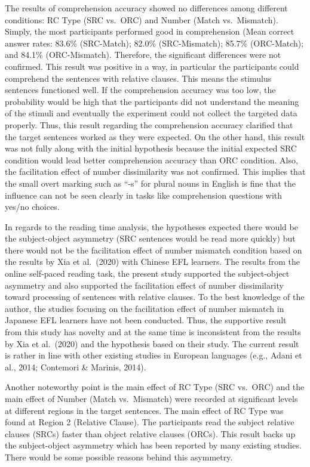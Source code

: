 \documentclass[
]{article}
\begin{document}
The results of comprehension accuracy showed no differences among
different conditions: RC Type (SRC vs.~ORC) and Number (Match
vs.~Mismatch). Simply, the most participants performed good in
comprehension (Mean correct answer rates: 83.6\% (SRC-Match); 82.0\%
(SRC-Mismatch); 85.7\% (ORC-Match); and 84.1\% (ORC-Mismatch).
Therefore, the significant differences were not confirmed. This result
was positive in a way, in particular the participants could comprehend
the sentences with relative clauses. This means the stimulus sentences
functioned well. If the comprehension accuracy was too low, the
probability would be high that the participants did not understand the
meaning of the stimuli and eventually the experiment could not collect
the targeted data properly. Thus, this result regarding the
comprehension accuracy clarified that the target sentences worked as
they were expected. On the other hand, this result was not fully along
with the initial hypothesis because the initial expected SRC condition
would lead better comprehension accuracy than ORC condition. Also, the
facilitation effect of number dissimilarity was not confirmed. This
implies that the small overt marking such as ``-s'' for plural nouns in
English is fine that the influence can not be seen clearly in tasks like
comprehension questions with yes/no choices.

In regards to the reading time analysis, the hypotheses expected there
would be the subject-object asymmetry (SRC sentences would be read more
quickly) but there would not be the facilitation effect of number
mismatch condition based on the results by Xia et al.~(2020) with
Chinese EFL learners. The results from the online self-paced reading
task, the present study supported the subject-object asymmetry and also
supported the facilitation effect of number dissimilarity toward
processing of sentences with relative clauses. To the best knowledge of
the author, the studies focusing on the facilitation effect of number
mismatch in Japanese EFL learners have not been conducted. Thus, the
supportive result from this study has novelty and at the same time is
inconsistent from the results by Xia et al.~(2020) and the hypothesis
based on their study. The current result is rather in line with other
existing studies in European languages (e.g., Adani et al., 2014;
Contemori \& Marinis, 2014).

Another noteworthy point is the main effect of RC Type (SRC vs.~ORC) and
the main effect of Number (Match vs.~Mismatch) were recorded at
significant levels at different regions in the target sentences. The
main effect of RC Type was found at Region 2 (Relative Clause). The
participants read the subject relative clauses (SRCs) faster than object
relative clauses (ORCs). This result backs up the subject-object
asymmetry which has been reported by many existing studies. There would
be some possible reasons behind this asymmetry.
\end{document}
